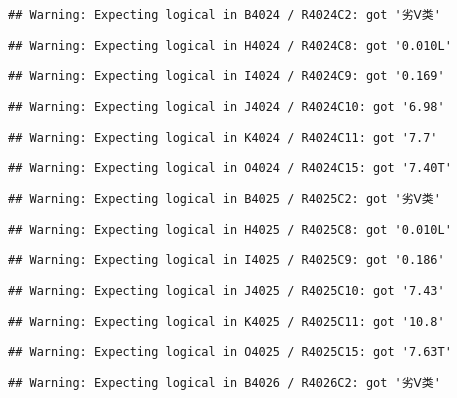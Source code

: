 \documentclass[
]{article}
\begin{document}
\begin{verbatim}
## Warning: Expecting logical in B4024 / R4024C2: got '劣Ⅴ类'
\end{verbatim}

\begin{verbatim}
## Warning: Expecting logical in H4024 / R4024C8: got '0.010L'
\end{verbatim}

\begin{verbatim}
## Warning: Expecting logical in I4024 / R4024C9: got '0.169'
\end{verbatim}

\begin{verbatim}
## Warning: Expecting logical in J4024 / R4024C10: got '6.98'
\end{verbatim}

\begin{verbatim}
## Warning: Expecting logical in K4024 / R4024C11: got '7.7'
\end{verbatim}

\begin{verbatim}
## Warning: Expecting logical in O4024 / R4024C15: got '7.40T'
\end{verbatim}

\begin{verbatim}
## Warning: Expecting logical in B4025 / R4025C2: got '劣Ⅴ类'
\end{verbatim}

\begin{verbatim}
## Warning: Expecting logical in H4025 / R4025C8: got '0.010L'
\end{verbatim}

\begin{verbatim}
## Warning: Expecting logical in I4025 / R4025C9: got '0.186'
\end{verbatim}

\begin{verbatim}
## Warning: Expecting logical in J4025 / R4025C10: got '7.43'
\end{verbatim}

\begin{verbatim}
## Warning: Expecting logical in K4025 / R4025C11: got '10.8'
\end{verbatim}

\begin{verbatim}
## Warning: Expecting logical in O4025 / R4025C15: got '7.63T'
\end{verbatim}

\begin{verbatim}
## Warning: Expecting logical in B4026 / R4026C2: got '劣Ⅴ类'
\end{verbatim}
\end{document}
